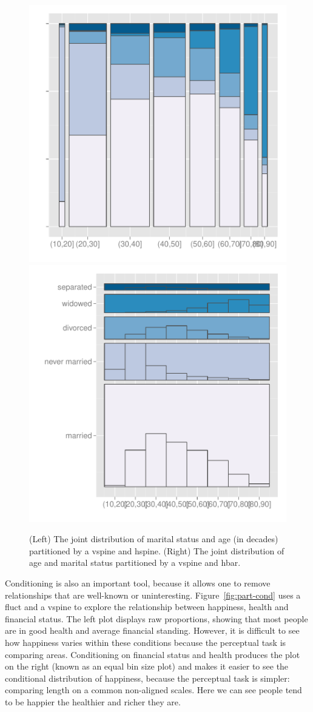 \documentclass[letterpaper,oneside]{scrartcl}
\begin{document}
\begin{figure}[htbp]
  \centering
    \includegraphics[width=0.5\linewidth]{part-marital-1}%
    \includegraphics[width=0.5\linewidth]{part-marital-2}
  \caption{(Left) The joint distribution of marital status and age (in decades) partitioned by a vspine and hspine.  (Right) The joint distribution of age and marital status partitioned by a vspine and hbar.}
  \label{fig:marital}
\end{figure}

Conditioning is also an important tool, because it allows one to remove relationships that are well-known or uninteresting. Figure~\ref{fig:part-cond} uses a fluct and a vspine to explore the relationship between happiness, health and financial status. The left plot displays raw proportions, showing that most people are in good health and average financial standing. However, it is difficult to see how happiness varies within these conditions because the perceptual task is comparing areas. Conditioning on financial status and health produces the plot on the right (known as an equal bin size plot) and makes it easier to see the conditional distribution of happiness, because the perceptual task is simpler: comparing length on a common non-aligned scales.  Here we can see people tend to be happier the healthier and richer they are.
\end{document}

